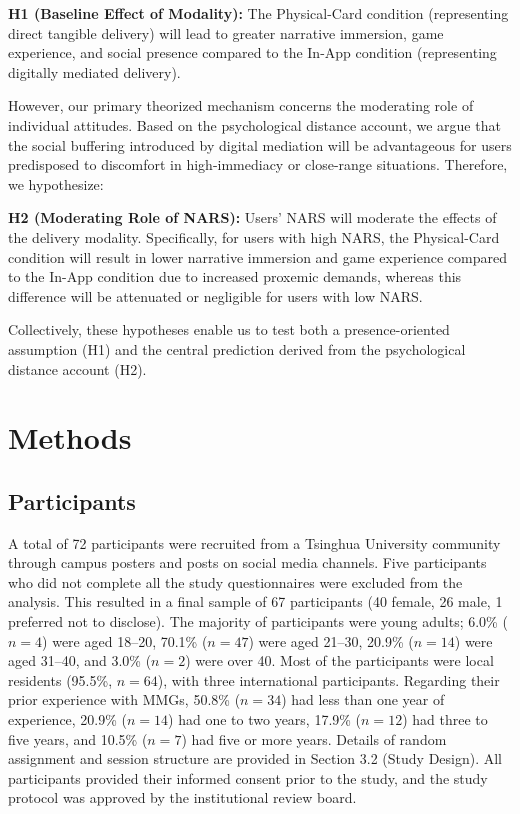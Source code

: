 \documentclass[sigconf,screen]{acmart-tagged}
\begin{document}
\textbf{H1 (Baseline Effect of Modality):} The Physical-Card condition (representing direct tangible delivery) will lead to greater narrative immersion, game experience, and social presence compared to the In-App condition (representing digitally mediated delivery).

However, our primary theorized mechanism concerns the moderating role of individual attitudes. Based on the psychological distance account, we argue that the social buffering introduced by digital mediation will be advantageous for users predisposed to discomfort in high-immediacy or close-range situations. Therefore, we hypothesize:

\textbf{H2 (Moderating Role of NARS):} Users' NARS will moderate the effects of the delivery modality. Specifically, for users with high NARS, the Physical-Card condition will result in lower narrative immersion and game experience compared to the In-App condition due to increased proxemic demands, whereas this difference will be attenuated or negligible for users with low NARS.

Collectively, these hypotheses enable us to test both a presence-oriented assumption (H1) and the central prediction derived from the psychological distance account (H2).

\vspace{-8pt}
\section{Methods}
\subsection{Participants}
A total of 72 participants were recruited from a Tsinghua University community through campus posters and posts on social media channels. Five participants who did not complete all the study questionnaires were excluded from the analysis. This resulted in a final sample of 67 participants (40 female, 26 male, 1 preferred not to disclose). The majority of participants were young adults; 6.0\% ($n=4$) were aged 18--20, 70.1\% ($n=47$) were aged 21--30, 20.9\% ($n=14$) were aged 31--40, and 3.0\% ($n=2$) were over 40. Most of the participants were local residents (95.5\%, $n=64$), with three international participants. Regarding their prior experience with MMGs, 50.8\% ($n=34$) had less than one year of experience, 20.9\% ($n=14$) had one to two years, 17.9\% ($n=12$) had three to five years, and 10.5\% ($n=7$) had five or more years. Details of random assignment and session structure are provided in Section 3.2 (Study Design). All participants provided their informed consent prior to the study, and the study protocol was approved by the institutional review board.
\end{document}
